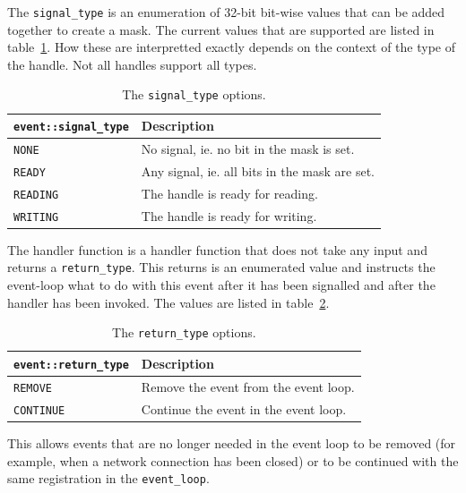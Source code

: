 \documentclass[10pt,a4paper,openany]{mudbook}
\makeatletter
\newcommand{\indextt}[2][]{\texttt{#2}\index{#2@\texttt{#2}#1}}
\makeatother
\begin{document}
The \indextt{signal\_type} is an enumeration of 32-bit bit-wise values that
can be added together to create a mask. The current values that are supported
are listed in table~\ref{tbl:signal_type}. How these are interpretted exactly
depends on the context of the type of the handle. Not all handles support all
types.

\begin{table}[h!]
  \begin{center}
    \begin{tabular}{l|p{}}
      \textbf{\texttt{event::signal\_type}} & \textbf{Description}  \\
      \hline
      \texttt{NONE} & No signal, ie. no bit in the mask is set. \\
      \texttt{READY} & Any signal, ie. all bits in the mask are set.  \\
      \texttt{READING} & The handle is ready for reading.  \\
      \texttt{WRITING} & The handle is ready for writing.  \\
    \end{tabular}
    \caption{The \texttt{signal\_type} options.}
    \label{tbl:signal_type}
  \end{center}
\end{table}

The handler function is a handler function that does not take any input and
returns a \texttt{return\_type}. This returns is an enumerated value and
instructs the event-loop what to do with this event after it has been signalled
and after the handler has been invoked. The values are listed in
table~\ref{tbl:return_type}.

\begin{table}[h!]
  \begin{center}
    \begin{tabular}{l|p{}}
      \textbf{\texttt{event::return\_type}} & \textbf{Description}  \\
      \hline
      \texttt{REMOVE} & Remove the event from the event loop.  \\
      \texttt{CONTINUE} & Continue the event in the event loop.  \\
    \end{tabular}
    \caption{The \texttt{return\_type} options.}
    \label{tbl:return_type}
  \end{center}
\end{table}

This allows events that are no longer needed in the event loop to be removed
(for example, when a network connection has been closed) or to be continued
with the same registration in the \texttt{event\_loop}.
\end{document}
